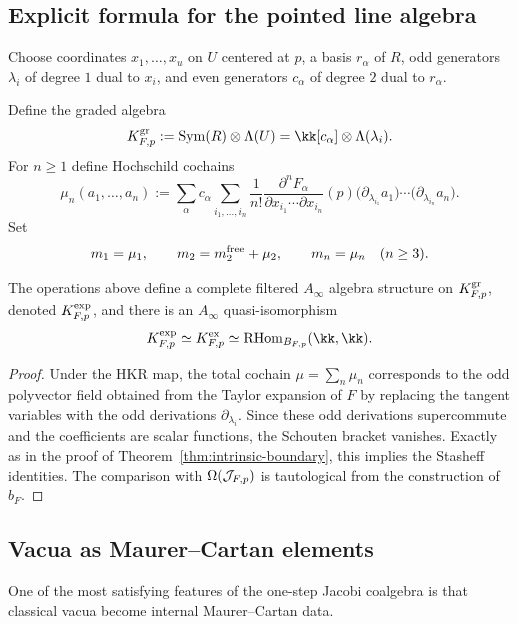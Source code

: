 \subsection{Explicit formula for the pointed line algebra}

Choose coordinates $x_1,\dots,x_u$ on $U$ centered at $p$, a basis $r_\alpha$ of $R$, odd generators $\lambda_i$ of degree $1$ dual to $x_i$, and even generators $c_\alpha$ of degree $2$ dual to $r_\alpha$.

Define the graded algebra
\[
K_{F,p}^{\gr}:=\Sym(R)\ot \Lambda(U)=\kk[c_\alpha]\ot \Lambda(\lambda_i).
\]
For $n\ge 1$ define Hochschild cochains
\begin{equation}%
\mu_n(a_1,\dots,a_n)
:=
\sum_{\alpha}
c_\alpha
\sum_{i_1,\dots,i_n}
\frac{1}{n!}
\frac{\partial^n F_\alpha}{\partial x_{i_1}\cdots \partial x_{i_n}}(p)
\bigl(\partial_{\lambda_{i_1}}a_1\bigr)\cdots \bigl(\partial_{\lambda_{i_n}}a_n\bigr).
\end{equation}
Set
\[
m_1=\mu_1,
\qquad
m_2=m_2^{\mathrm{free}}+\mu_2,
\qquad
m_n=\mu_n\quad (n\ge 3).
\]

\begin{corollary}%
The operations above define a complete filtered $A_\infty$ algebra structure on $K_{F,p}^{\operatorname{gr}}$, denoted $K^{\mathrm{exp}}_{F,p}$, and there is an $A_\infty$ quasi-isomorphism
\[
K^{\expmod}_{F,p}\simeq K^{\mathrm{ex}}_{F,p}\simeq \RHom_{B_{F,p}}(\kk,\kk).
\]
\end{corollary}

\begin{proof}
Under the HKR map, the total cochain $\mu=\sum_n \mu_n$ corresponds to the odd polyvector field obtained from the Taylor expansion of $F$ by replacing the tangent variables with the odd derivations $\partial_{\lambda_i}$. Since these odd derivations supercommute and the coefficients are scalar functions, the Schouten bracket vanishes. Exactly as in the proof of Theorem~\ref{thm:intrinsic-boundary}, this implies the Stasheff identities. The comparison with $\operatorname{\Omega}(\mathcal J_{F,p})$ is tautological from the construction of $b_F$.
\end{proof}

\subsection{Vacua as Maurer--Cartan elements}

One of the most satisfying features of the one-step Jacobi coalgebra is that classical vacua become internal Maurer--Cartan data.

